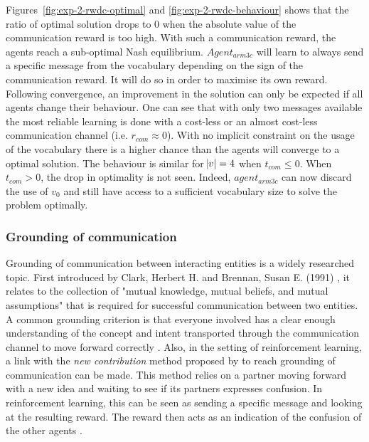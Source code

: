 Figures~\ref{fig:exp-2-rwdc-optimal} and \ref{fig:exp-2-rwdc-behaviour} shows that the ratio of optimal solution drops to 0 when the absolute value of the communication reward is too high. With such a communication reward, the agents reach a sub-optimal Nash equilibrium. $Agent_{arm3c}$ will learn to always send a specific message from the vocabulary depending on the sign of the communication reward. It will do so in order to maximise its own reward. Following convergence, an improvement in the solution can only be expected if all agents change their behaviour. One can see that with only two messages available the most reliable learning is done with a cost-less or an almost cost-less communication channel (i.e. $r_{com}\approx0$). With no implicit constraint on the usage of the vocabulary there is a higher chance than the agents will converge to a optimal solution. The behaviour is similar for $\abs{v}=4$ when $t_{com} \leq 0$. When $t_{com} > 0$, the drop in optimality is not seen. Indeed, $agent_{arm3c}$ can now discard the use of $v_0$ and still have access to a sufficient vocabulary size to solve the problem optimally.


\subsubsection*{Grounding of communication}

Grounding of communication between interacting entities is a widely researched topic. First introduced by Clark, Herbert H. and Brennan, Susan E. (1991) \cite{resnick_grounding_1991}, it relates to the collection of "mutual knowledge, mutual beliefs, and mutual assumptions" that is required for successful communication between two entities. A common grounding criterion is that everyone involved has a clear enough understanding of the concept and intent transported through the communication channel to move forward correctly \cite{horvitz_grounding_2000}. Also, in the setting of reinforcement learning, a link with the \textit{new contribution} method proposed by \cite{clark_contributing_nodate} to reach grounding of communication can be made. This method relies on a partner moving forward with a new idea and waiting to see if its partners expresses confusion. In reinforcement learning, this can be seen as sending a specific message and looking at the resulting reward. The reward then acts as an indication of the confusion of the other agents \cite{koschmann_reconsidering_2003}.

